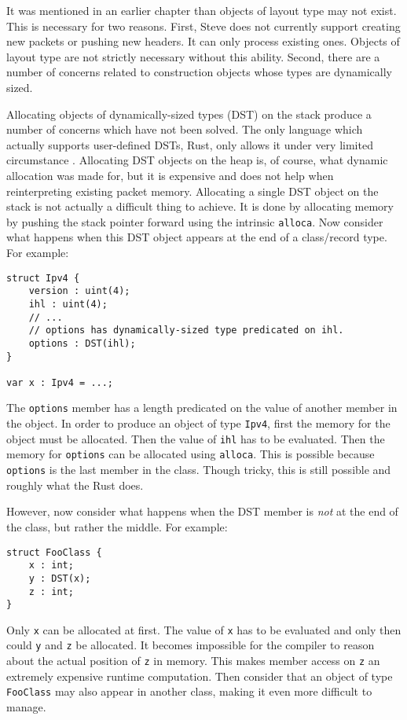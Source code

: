 It was mentioned in an earlier chapter than objects of layout type may not exist.
This is necessary for two reasons.
First, Steve does not currently support creating new packets or pushing new headers.
It can only process existing ones.
Objects of layout type are not strictly necessary without this ability.
Second, there are a number of concerns related to construction objects whose
types are dynamically sized.

Allocating objects of dynamically-sized types (DST) on the stack produce a number of concerns which have not been solved.
The only language which actually supports user-defined DSTs, Rust, only allows it under
very limited circumstance \cite{rust_dst_std}.
Allocating DST objects on the heap is, of course, what dynamic allocation was made for, but
it is expensive and does not help when reinterpreting existing packet memory.
Allocating a single DST object on the stack is not actually a difficult thing to achieve.
It is done by allocating memory by pushing the stack pointer forward using the intrinsic
\texttt{alloca}.
Now consider what happens when this DST object appears at the end of a class/record
type. For example:

\begin{lstlisting}
struct Ipv4 {
	version : uint(4);
	ihl : uint(4);
	// ...
	// options has dynamically-sized type predicated on ihl.
	options : DST(ihl);
}

var x : Ipv4 = ...;
\end{lstlisting}

The \texttt{options} member has a length predicated on the value
of another member in the object. In order to produce an object of type \texttt{Ipv4},
first the memory for the object must be allocated. Then the value of \texttt{ihl}
has to be evaluated. Then the memory for \texttt{options} can be allocated
using \texttt{alloca}. This is possible because \texttt{options} is the last member in the class. Though tricky, this is still possible and roughly what the Rust does.

However, now consider what happens when the DST member is \emph{not} at the end
of the class, but rather the middle. For example:

\begin{lstlisting}
struct FooClass {
	x : int;
	y : DST(x);
	z : int;
}
\end{lstlisting}

Only \texttt{x} can be allocated at first. The value of \texttt{x} has to be evaluated
and only then could \texttt{y} and \texttt{z} be allocated. It becomes impossible
for the compiler to reason about the actual position of \texttt{z} in memory. This
makes member access on \texttt{z} an extremely expensive runtime computation.
Then consider that an object of type \texttt{FooClass} may also appear in
another class, making it even more difficult to manage.

